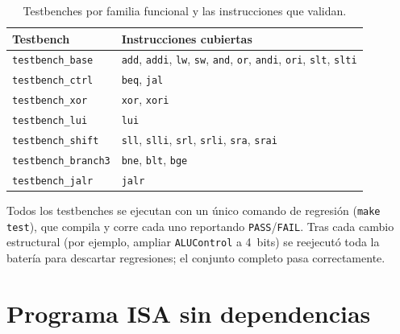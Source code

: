 \documentclass[11pt,a4paper]{article}
\begin{document}
\begin{table}[ht]
	\centering
	\begin{tabular}{@{}ll@{}}
		\toprule
		\textbf{Testbench}          & \textbf{Instrucciones cubiertas}                                                                                                           \\
		\midrule
		\texttt{testbench\_base}    & \texttt{add}, \texttt{addi}, \texttt{lw}, \texttt{sw}, \texttt{and}, \texttt{or}, \texttt{andi}, \texttt{ori}, \texttt{slt}, \texttt{slti} \\
		\texttt{testbench\_ctrl}    & \texttt{beq}, \texttt{jal}                                                                                                                 \\
		\texttt{testbench\_xor}     & \texttt{xor}, \texttt{xori}                                                                                                                \\
		\texttt{testbench\_lui}     & \texttt{lui}                                                                                                                               \\
		\texttt{testbench\_shift}   & \texttt{sll}, \texttt{slli}, \texttt{srl}, \texttt{srli}, \texttt{sra}, \texttt{srai}                                                      \\
		\texttt{testbench\_branch3} & \texttt{bne}, \texttt{blt}, \texttt{bge}                                                                                                   \\
		\texttt{testbench\_jalr}    & \texttt{jalr}                                                                                                                              \\
		\bottomrule
	\end{tabular}
	\caption{Testbenches por familia funcional y las instrucciones que validan.}
	\label{cuadro:tests}
\end{table}

Todos los testbenches se ejecutan con un único comando de regresión
(\texttt{make test}), que compila y corre cada uno reportando \texttt{PASS}/\texttt{FAIL}.
Tras cada cambio estructural (por ejemplo, ampliar \texttt{ALUControl} a 4~bits) se
reejecutó toda la batería para descartar regresiones; el conjunto completo pasa
correctamente.

\section{Programa ISA sin dependencias}
\end{document}
